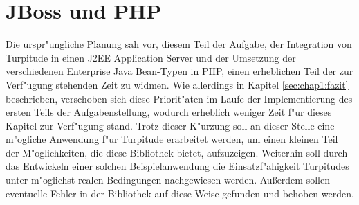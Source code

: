 \chapter{JBoss und PHP}
\label{sec:chap2}

Die urspr"ungliche Planung sah vor, diesem Teil der Aufgabe, der Integration von Turpitude in einen
J2EE Application Server und der Umsetzung der verschiedenen Enterprise Java Bean-Typen in PHP, einen
erheblichen Teil der zur Verf"ugung stehenden Zeit zu widmen. Wie allerdings in Kapitel \ref{sec:chap1:fazit}
beschrieben, verschoben sich diese Priorit"aten im Laufe der Implementierung des ersten Teils der Aufgabenstellung,
wodurch erheblich weniger Zeit f"ur dieses Kapitel zur Verf"ugung stand. Trotz dieser K"urzung soll an dieser Stelle
eine m"ogliche Anwendung f"ur Turpitude erarbeitet werden, um einen kleinen Teil der M"oglichkeiten, die diese 
Bibliothek bietet, aufzuzeigen. Weiterhin soll durch das Entwickeln einer solchen Beispielanwendung die
Einsatzf"ahigkeit Turpitudes unter m"oglichst realen Bedingungen nachgewiesen werden. Au\ss erdem sollen
eventuelle Fehler in der Bibliothek auf diese Weise gefunden und behoben werden.




\clearpage

\clearpage

\clearpage

\clearpage






